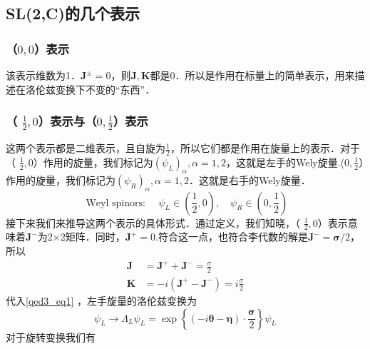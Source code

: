 \subsection{SL(2,C)的几个表示}
\subsubsection{（$0,0$）表示}
该表示维数为1．$\mathbf{J}^{\pm}=0$，则$\mathbf{J},\mathbf{K}$都是0．所以是作用在标量上的简单表示，用来描述在洛伦兹变换下不变的“东西”．
\subsubsection{（ $\frac{1}{2},0$）表示与（$0,\frac{1}{2}$）表示}
这两个表示都是二维表示，且自旋为$\frac{1}{2}$，所以它们都是作用在旋量上的表示．对于（ $\frac{1}{2},0$）作用的旋量，我们标记为$\left(\psi_{L}\right)_{\alpha},\alpha=1,2$，这就是左手的Wely旋量.($0,\frac{1}{2}$）作用的旋量，我们标记为$\left(\psi_{R}\right)_{\alpha},\alpha=1,2$．这就是右手的Wely旋量．
\begin{equation}
\text { Weyl spinors: } \quad \psi_{L} \in\left(\frac{1}{2}, 0\right), \quad \psi_{R} \in\left(0, \frac{1}{2}\right)
\end{equation}
接下来我们来推导这两个表示的具体形式．通过定义，我们知晓，（ $\frac{1}{2},0$）表示意味着$\mathbf{J}^{-}$为2×2矩阵．同时，$\mathbf{J}^{+}=0$.符合这一点，也符合李代数的解是$\mathbf{J}^{-}=\boldsymbol{\sigma} / 2$，所以
\begin{equation}
\begin{aligned}
\mathbf{J} &=\mathbf{J}^{+}+\mathbf{J}^{-}=\frac{\sigma}{2} \\
\mathbf{K} &=-i\left(\mathbf{J}^{+}-\mathbf{J}^{-}\right)=i \frac{\sigma}{2}
\end{aligned}
\end{equation}
代入\autoref{qed3_eq1} ，左手旋量的洛伦兹变换为
\begin{equation}
\psi_{L} \rightarrow \Lambda_{L} \psi_{L}=\exp \left\{(-i \boldsymbol{\theta}-\boldsymbol{\eta}) \cdot \frac{\boldsymbol{\sigma}}{2}\right\} \psi_{L}
\end{equation}
对于旋转变换我们有

